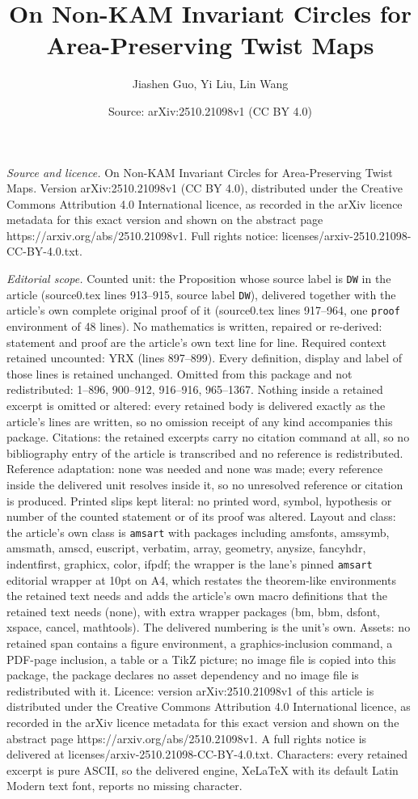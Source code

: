 \documentclass[10pt,a4paper]{amsart}
\title[On Non-KAM Invariant Circles for Area-Preserving Twist Maps]{On Non-KAM Invariant Circles for Area-Preserving Twist Maps}
\author{Jiashen Guo, Yi Liu, Lin Wang}
\date{Source: arXiv:2510.21098v1 (CC BY 4.0)}
\begin{document}
\maketitle

\noindent\emph{Source and licence.} On Non-KAM Invariant Circles for Area-Preserving Twist Maps. Version arXiv:2510.21098v1 (CC BY 4.0), distributed under the Creative Commons Attribution 4.0 International licence, as recorded in the arXiv licence metadata for this exact version and shown on the abstract page https://arxiv.org/abs/2510.21098v1. Full rights notice: licenses/arxiv-2510.21098-CC-BY-4.0.txt.\par\smallskip

\noindent\textit{Editorial scope.} Counted unit: the Proposition whose source label is \texttt{DW} in the article (source0.tex lines 913--915, source label \texttt{DW}), delivered together with the article's own complete original proof of it (source0.tex lines 917--964, one \texttt{proof} environment of 48 lines). No mathematics is written, repaired or re-derived: statement and proof are the article's own text line for line. Required context retained uncounted: YRX (lines 897--899). Every definition, display and label of those lines is retained unchanged. Omitted from this package and not redistributed: 1--896, 900--912, 916--916, 965--1367. Nothing inside a retained excerpt is omitted or altered: every retained body is delivered exactly as the article's lines are written, so no omission receipt of any kind accompanies this package. Citations: the retained excerpts carry no citation command at all, so no bibliography entry of the article is transcribed and no reference is redistributed. Reference adaptation: none was needed and none was made; every reference inside the delivered unit resolves inside it, so no unresolved reference or citation is produced. Printed slips kept literal: no printed word, symbol, hypothesis or number of the counted statement or of its proof was altered. Layout and class: the article's own class is \texttt{amsart} with packages including amsfonts, amssymb, amsmath, amscd, euscript, verbatim, array, geometry, anysize, fancyhdr, indentfirst, graphicx, color, ifpdf; the wrapper is the lane's pinned \texttt{amsart} editorial wrapper at 10pt on A4, which restates the theorem-like environments the retained text needs and adds the article's own macro definitions that the retained text needs (none), with extra wrapper packages (bm, bbm, dsfont, xspace, cancel, mathtools). The delivered numbering is the unit's own. Assets: no retained span contains a figure environment, a graphics-inclusion command, a PDF-page inclusion, a table or a TikZ picture; no image file is copied into this package, the package declares no asset dependency and no image file is redistributed with it. Licence: version arXiv:2510.21098v1 of this article is distributed under the Creative Commons Attribution 4.0 International licence, as recorded in the arXiv licence metadata for this exact version and shown on the abstract page https://arxiv.org/abs/2510.21098v1. A full rights notice is delivered at licenses/arxiv-2510.21098-CC-BY-4.0.txt. Characters: every retained excerpt is pure ASCII, so the delivered engine, XeLaTeX with its default Latin Modern text font, reports no missing character.
\end{document}
